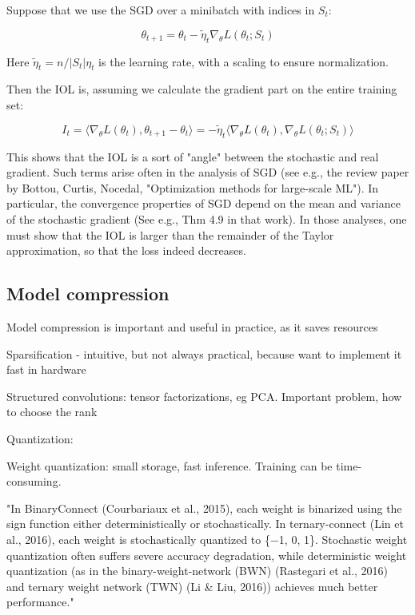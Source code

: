 \documentclass[english]{article}
\begin{document}
Suppose that we use the SGD over a minibatch with indices in $S_t$: 

$$\theta_{t+1} = \theta_{t} - \tilde\eta_t \nabla_\theta L(\theta_{t};S_t)$$

Here $\tilde\eta_t = n/|S_t|\eta_t$ is the learning rate, with a scaling to ensure normalization. 

Then the IOL is, assuming we calculate the gradient part on the entire training set: 

$$I_t = 
\langle\nabla_\theta L(\theta_{t} ), \theta_{t+1} - \theta_{t} 
\rangle
=
- \tilde\eta_t 
\langle\nabla_\theta L(\theta_{t} ), \nabla_\theta L(\theta_{t};S_t)
\rangle 
$$

This shows that the IOL is a sort of "angle" between the stochastic and real gradient. Such terms arise often in the analysis of SGD (see e.g., the review paper by Bottou, Curtis, Nocedal, "Optimization methods for large-scale ML"). In particular, the convergence properties of SGD depend on the mean and variance of the stochastic gradient (See e.g., Thm 4.9 in that work). In those analyses, one must show that the IOL is larger than the remainder of the Taylor approximation, so that the loss indeed decreases. 

\eenum 



\subsection{Model compression}


\benum 
\item Model compression is important and useful in practice, as it saves resources

\item Sparsification - intuitive, but not always practical, because want to implement it fast in hardware 

\item Structured convolutions: tensor factorizations, eg PCA. Important problem, how to choose the rank

\item Quantization:

Weight quantization: small storage, fast inference. Training can be time-consuming. 

"In BinaryConnect (Courbariaux et al., 2015), each weight is binarized using the sign function either
deterministically or stochastically. In ternary-connect (Lin et al., 2016), each weight is stochastically
quantized to \{−1, 0, 1\}. Stochastic weight quantization often suffers severe accuracy degradation,
while deterministic weight quantization (as in the binary-weight-network (BWN) (Rastegari et al.,
2016) and ternary weight network (TWN) (Li \& Liu, 2016)) achieves much better performance."
\end{document}
